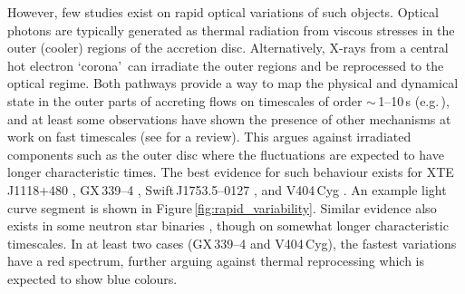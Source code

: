 \documentclass{pasa}%
\begin{document}
However, few studies exist on rapid optical variations of such objects. Optical photons are typically generated as thermal radiation from viscous stresses in the outer (cooler) regions of the accretion disc. Alternatively, X-rays from a central hot electron \lq corona\rq\ can irradiate the outer regions and be reprocessed to the optical regime. Both pathways provide a way to map the physical and dynamical state in the outer parts of accreting flows on timescales of order $\sim$\,1--10\,s (e.g.\,\citealt{obrien02}), and at least some observations have shown the presence of other mechanisms at work on fast timescales (see \citealt{uttleycasella14} for a review). This argues against irradiated components such as the outer disc where the fluctuations are expected to have longer characteristic times. The best evidence for such behaviour exists for XTE\,J1118+480 \citep{kanbach01}, GX\,339--4 \citep{motch82, gandhi10}, Swift\,J1753.5--0127 \citep{durant08}, and V404\,Cyg \citep{gandhi16}. An example light curve segment is shown in Figure\,\ref{fig:rapid_variability}. Similar evidence also exists in some neutron star binaries \citep{durant11}, though on somewhat longer characteristic timescales. In at least two cases (GX\,339--4 and V404\,Cyg), the fastest variations have a red spectrum, further arguing against thermal reprocessing which is expected to show blue colours.


\end{document}
